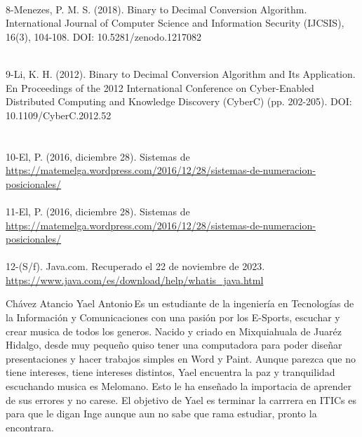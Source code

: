 \documentclass{IEEEcsmag}
\begin{document}
\begin{thebibliography}{1}
  \\
  8-Menezes, P. M. S. (2018). Binary to Decimal Conversion Algorithm. International Journal of Computer Science and Information Security (IJCSIS), 16(3), 104-108. DOI: 10.5281/zenodo.1217082

 \\
  9-Li, K. H. (2012). Binary to Decimal Conversion Algorithm and Its Application. En Proceedings of the 2012 International Conference on Cyber-Enabled Distributed Computing and Knowledge Discovery (CyberC) (pp. 202-205). DOI: 10.1109/CyberC.2012.52
   \\
   \\
  \\
   10-El, P. (2016, diciembre 28). Sistemas de 
   \url{https://matemelga.wordpress.com/2016/12/28/sistemas-de-numeracion-posicionales/} \\
   
   \\
   11-El, P. (2016, diciembre 28). Sistemas de 
   \url{https://matemelga.wordpress.com/2016/12/28/sistemas-de-numeracion-posicionales/} \\
   
   \\
   12-(S/f). Java.com. Recuperado el 22 de noviembre de 2023. \url{https://www.java.com/es/download/help/whatis_java.html}\\\end{thebibliography}\vspace*{-8pt}


\begin{IEEEbiography}{Chávez Atancio Yael Antonio}{\,}Es un estudiante de la ingeniería en Tecnologías de la Información y Comunicaciones con una pasión por los E-Sports, escuchar y crear musica de todos los generos. Nacido y criado en Mixquiahuala de Juaréz Hidalgo, desde muy pequeño quiso tener una computadora para poder diseñar presentaciones y hacer trabajos simples en Word y Paint. Aunque parezca que no tiene intereses, tiene intereses distintos, Yael encuentra la paz y tranquilidad escuchando musica es Melomano. Esto le ha enseñado la importacia de aprender de sus errores y no carese. El objetivo de Yael es terminar la carrrera  en ITICs es para que le digan Inge aunque aun no sabe que rama estudiar, pronto la encontrara.
\end{IEEEbiography}
\end{document}
